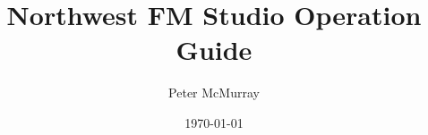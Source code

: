 \documentclass[a4paper,draft,showtrims]{memoir}
\begin{document}
\begin{titlingpage}
	\title{Northwest FM Studio Operation Guide}
	\author{Peter McMurray}
	\date{\today}
	\maketitle
\end{titlingpage}

\frontmatter
	\tableofcontents

\mainmatter
	
	
	
	
	
	
	
	
	

\backmatter
\end{document}
